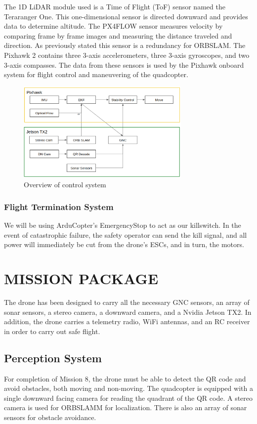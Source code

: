 \documentclass[12pt,letterpaper]{article}
\begin{document}
			The 1D LiDAR module used is a Time of Flight (ToF) sensor named the Teraranger One. This one-dimensional sensor is directed downward and provides data to determine altitude. The PX4FLOW sensor measures velocity by comparing frame by frame images and measuring the distance traveled and direction. As previously stated this sensor is a redundancy for ORBSLAM. The Pixhawk 2 contains three 3-axis accelerometers, three 3-axis gyroscopes, and two 3-axis compasses. The data from these sensors is used by the Pixhawk onboard system for flight control and maneuvering of the quadcopter.

		\begin{figure}[!htbp]
			\begin{center}
				\includegraphics[width=0.75\textwidth]{system}
				\caption*{Overview of control system}
			\end{center}
		\end{figure}

		\subsubsection*{Flight Termination System}
			We will be using ArduCopter's EmergencyStop to act as our killswitch. In the event of catastrophic failure, the safety operator can send the kill signal, and all power will immediately be cut from the drone's ESCs, and in turn, the motors.


\section*{MISSION PACKAGE}
	The drone has been designed to carry all the necessary GNC sensors, an array of sonar sensors, a stereo camera, a downward camera, and a Nvidia Jetson TX2. In addition, the drone carries a telemetry radio, WiFi antennas, and an RC receiver in order to carry out safe flight.
	\subsection*{Perception System}
	For completion of Mission 8, the drone must be able to detect the QR code and avoid obstacles, both moving and non-moving. The quadcopter is equipped with a single downward facing camera for reading the quadrant of the QR code. A stereo camera is used for ORBSLAMM for localization. There is also an array of sonar sensors for obstacle avoidance.
\end{document}
